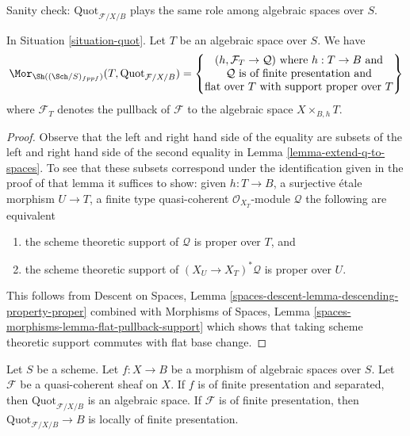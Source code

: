 \noindent
Sanity check: $\text{Quot}_{\mathcal{F}/X/B}$
plays the same role among algebraic spaces
over $S$.

\begin{lemma}
\label{lemma-extend-quot-to-spaces}
In Situation \ref{situation-quot}. Let $T$ be an algebraic space over $S$.
We have
$$
\Mor_{\Sh((\Sch/S)_{fppf})}(T,  \text{Quot}_{\mathcal{F}/X/B}) =
\left\{
\begin{matrix}
(h, \mathcal{F}_T \to \mathcal{Q}) \text{ where }
h : T \to B \text{ and}\\
\mathcal{Q}\text{ is of finite presentation and}\\
\text{flat over }T\text{ with support proper over }T
\end{matrix}
\right\}
$$
where $\mathcal{F}_T$ denotes the pullback of $\mathcal{F}$
to the algebraic space $X \times_{B, h} T$.
\end{lemma}

\begin{proof}
Observe that the left and right hand side of the equality are
subsets of the left and right hand side of the second equality in
Lemma \ref{lemma-extend-q-to-spaces}.
To see that these subsets correspond under
the identification given in the proof of that lemma
it suffices to show: given $h : T \to B$,
a surjective \'etale morphism $U \to T$,
a finite type quasi-coherent $\mathcal{O}_{X_T}$-module $\mathcal{Q}$
the following are equivalent
\begin{enumerate}
\item the scheme theoretic support of $\mathcal{Q}$ is proper
over $T$, and
\item the scheme theoretic support of $(X_U \to X_T)^*\mathcal{Q}$
is proper over $U$.
\end{enumerate}
This follows from
Descent on Spaces, Lemma \ref{spaces-descent-lemma-descending-property-proper}
combined with
Morphisms of Spaces, Lemma \ref{spaces-morphisms-lemma-flat-pullback-support}
which shows that taking scheme theoretic support commutes
with flat base change.
\end{proof}

\begin{proposition}
\label{proposition-quot}
Let $S$ be a scheme. Let $f : X \to B$ be a morphism of algebraic
spaces over $S$. Let $\mathcal{F}$ be a quasi-coherent sheaf
on $X$. If $f$ is of finite presentation and separated, then
$\text{Quot}_{\mathcal{F}/X/B}$
is an algebraic space. If $\mathcal{F}$ is of finite presentation,
then $\text{Quot}_{\mathcal{F}/X/B} \to B$ is locally of finite presentation.
\end{proposition}

